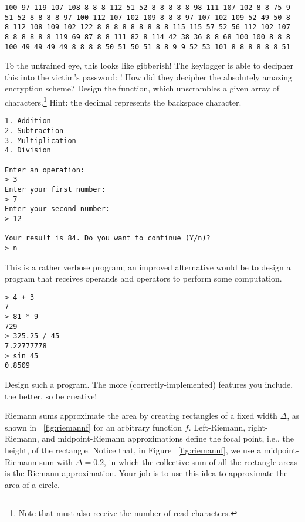 \begin{verbatim}
100 97 119 107 108 8 8 8 112 51 52 8 8 8 8 8 98 111 107 102 8 8 75 9 
51 52 8 8 8 8 97 100 112 107 102 109 8 8 8 97 107 102 109 52 49 50 8 
8 112 108 109 102 122 8 8 8 8 8 8 8 8 8 115 115 57 52 56 112 102 107
8 8 8 8 8 8 119 69 87 8 8 111 82 8 114 42 38 36 8 8 68 100 100 8 8 8 
100 49 49 49 49 8 8 8 8 50 51 50 51 8 8 9 9 52 53 101 8 8 8 8 8 8 51
\end{verbatim}
To the untrained eye, this looks like gibberish! The keylogger is able to decipher this into the victim's password: ! How did they decipher the absolutely amazing encryption scheme? Design the  function, which unscrambles a given array of characters.\footnote{Note that  must also receive the number of read characters.} Hint: the decimal  represents the backspace character.

\begin{verbatim}
1. Addition
2. Subtraction
3. Multiplication
4. Division

Enter an operation:
> 3
Enter your first number:
> 7
Enter your second number:
> 12

Your result is 84. Do you want to continue (Y/n)?
> n
\end{verbatim}
This is a rather verbose program; an improved alternative would be to design a program that receives operands and operators to perform some computation.
\begin{verbatim}
> 4 + 3
7
> 81 * 9
729
> 325.25 / 45
7.22777778
> sin 45
0.8509
\end{verbatim}
Design such a program. The more (correctly-implemented) features you include, the better, so be creative!

 Riemann sums approximate the area by creating rectangles of a fixed width $\Delta$, as shown in ~\ref{fig:riemannf} for an arbitrary function $f$. Left-Riemann, right-Riemann, and midpoint-Riemann approximations define the focal point, i.e., the height, of the rectangle. Notice that, in Figure ~\ref{fig:riemannf}, we use a midpoint-Riemann sum with $\Delta = 0.2$, in which the collective sum of all the rectangle areas is the Riemann approximation. Your job is to use this idea to approximate the area of a circle.

